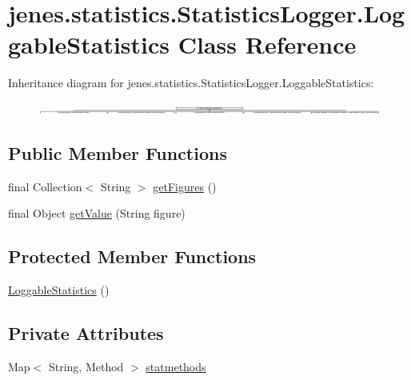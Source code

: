 \hypertarget{classjenes_1_1statistics_1_1_statistics_logger_1_1_loggable_statistics}{\section{jenes.\-statistics.\-Statistics\-Logger.\-Loggable\-Statistics Class Reference}
\label{classjenes_1_1statistics_1_1_statistics_logger_1_1_loggable_statistics}
}
Inheritance diagram for jenes.\-statistics.\-Statistics\-Logger.\-Loggable\-Statistics\-:\begin{figure}[H]
\begin{center}
\leavevmode
\includegraphics[height=0.303523cm]{classjenes_1_1statistics_1_1_statistics_logger_1_1_loggable_statistics}
\end{center}
\end{figure}
\subsection*{Public Member Functions}
\begin{DoxyCompactItemize}
\item 
final Collection$<$ String $>$ \hyperlink{classjenes_1_1statistics_1_1_statistics_logger_1_1_loggable_statistics_af29fe4dc17044a8879b62b4d05482d51}{get\-Figures} ()
\item 
final Object \hyperlink{classjenes_1_1statistics_1_1_statistics_logger_1_1_loggable_statistics_acb7ffceff2aa39fbd545f17df39dd877}{get\-Value} (String figure)
\end{DoxyCompactItemize}
\subsection*{Protected Member Functions}
\begin{DoxyCompactItemize}
\item 
\hyperlink{classjenes_1_1statistics_1_1_statistics_logger_1_1_loggable_statistics_ae5a06be4a046efa2cafa4d6e9943c5a9}{Loggable\-Statistics} ()
\end{DoxyCompactItemize}
\subsection*{Private Attributes}
\begin{DoxyCompactItemize}
\item 
Map$<$ String, Method $>$ \hyperlink{classjenes_1_1statistics_1_1_statistics_logger_1_1_loggable_statistics_a4c3dcfc80b9300adc8ed0942ae912f8d}{statmethods}
\end{DoxyCompactItemize}


